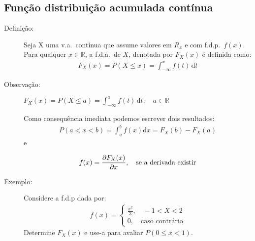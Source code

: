      \subsection{Função distribuição acumulada contínua}
     \begin{description}
       \item [Definição:] Seja X uma v.a.\ contínua que assume valores em $R_{x}$ e com 
         f.d.p.\ $f(x)$. Para qualquer $x \in \mathbb{R}$, a f.d.a.\ de $X$, denotada por 
         $F_{X}(x)$ é definida como: 
         \begin{align}
           F_{X}(x)= P(X \leq x)= \int_{-\infty}^{x} f(t) \,\mathrm{d}t 
         \end{align}
       \item [Observação:] $F_{X}(x)= P(X \leq a)= \displaystyle{\int_{-\infty}^{a}f(t) \,\mathrm{d}t}  , \quad a \in \mathbb{R}$

         Como consequência imediata podemos escrever dois resultados: 
         \begin{align}
           P(a <x<b)= \int_{a}^{b} f(x)\mathrm{d}x   = F_{X}(b)-F_{X}(a)
         \end{align}
         e 

         \begin{align}
           f(x)=\frac{\partial F_{X}(x)}{\partial x}, \text{\quad se a derivada existir}
         \end{align}

       \item [ Exemplo: ] Considere a f.d.p dada por: 
         \begin{align*}
           f(x)= 
           \begin{cases}
             \frac{x^2}{3} ,\quad  -1 < X < 2 \\
             0, \quad \text{caso contrário}
           \end{cases}
         \end{align*}
         Determine $F_{X}(x)$ e use-a para avaliar $P(0 \le x< 1)$.


\end{description}
